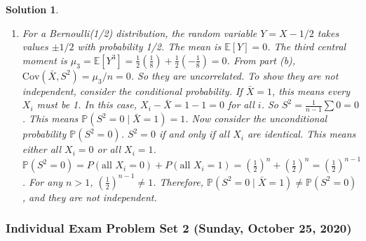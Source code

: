 \documentclass[12pt]{amsart}
\newtheorem*{solution}{Solution}
\begin{document}
\begin{solution}
\begin{enumerate}[label=(\alph*)]
$$$$
\item For a Bernoulli(1/2) distribution, the random variable $Y = X-1/2$ takes values $\pm 1/2$ with probability 1/2.
The mean is $\mathbb{E}[Y]=0$. The third central moment is $\mu_3 = \mathbb{E}[Y^3] = \frac{1}{2}(\frac{1}{8}) + \frac{1}{2}(-\frac{1}{8}) = 0$.
From part (b), $\text{Cov}(\bar{X}, S^2) = \mu_3/n = 0$. So they are uncorrelated.
To show they are not independent, consider the conditional probability.
If $\bar{X}=1$, this means every $X_i$ must be 1. In this case, $X_i - \bar{X} = 1-1=0$ for all $i$.
So $S^2 = \frac{1}{n-1}\sum 0 = 0$. This means $\mathbb{P}(S^2=0 \mid \bar{X}=1)=1$.
Now consider the unconditional probability $\mathbb{P}(S^2=0)$. $S^2=0$ if and only if all $X_i$ are identical. This means either all $X_i=0$ or all $X_i=1$.
$\mathbb{P}(S^2=0) = P(\text{all } X_i=0) + P(\text{all } X_i=1) = (\frac{1}{2})^n + (\frac{1}{2})^n = (\frac{1}{2})^{n-1}$.
For any $n>1$, $(\frac{1}{2})^{n-1} \neq 1$. Therefore, $\mathbb{P}(S^2=0 \mid \bar{X}=1) \neq \mathbb{P}(S^2=0)$, and they are not independent.
\end{enumerate}
\end{solution}

\subsubsection*{Individual Exam Problem Set 2 (Sunday, October 25, 2020)}
\end{document}
